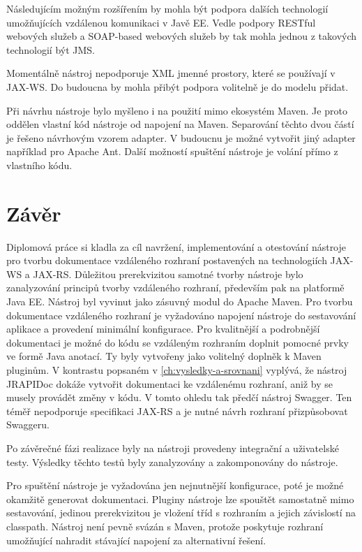 \documentclass[11pt,twoside,a4paper]{book}
\begin{document}
Následujícím možným rozšířením by mohla být podpora dalších technologií
umožňujících vzdálenou komunikaci v Javě EE. Vedle podpory RESTful webových
služeb a SOAP-based webových služeb by tak mohla jednou z takových technologií
být JMS.

Momentálně nástroj nepodporuje XML jmenné prostory, které se používají v JAX-WS.
Do budoucna by mohla přibýt podpora volitelně je do modelu přidat.

Při návrhu nástroje bylo myšleno i na použití mimo ekosystém Maven. Je proto
oddělen vlastní kód nástroje od napojení na Maven. Separování těchto dvou částí
je řešeno návrhovým vzorem adapter. V budoucnu je možné vytvořit jiný adapter
například pro Apache Ant. Další možností spuštění nástroje je volání přímo z
vlastního kódu.

\chapter{Závěr}

Diplomová práce si kladla za cíl navržení, implementování a otestování nástroje
pro tvorbu dokumentace vzdáleného rozhraní postavených na technologiích JAX-WS a
JAX-RS. Důležitou prerekvizitou samotné tvorby nástroje bylo zanalyzování
principů tvorby vzdáleného rozhraní, především pak na platformě Java EE. Nástroj
byl vyvinut jako zásuvný modul do Apache Maven. Pro tvorbu dokumentace
vzdáleného rozhraní je vyžadováno napojení nástroje do sestavování aplikace a
provedení minimální konfigurace. Pro kvalitnější a podrobnější dokumentaci je
možné do kódu se vzdáleným rozhraním doplnit pomocné
 prvky ve formě Java anotací. Ty byly vytvořeny jako volitelný doplněk k Maven
 pluginům. V kontrastu popsaném v \ref{ch:vysledky-a-srovnani} vyplývá, že
 nástroj JRAPIDoc dokáže vytvořit dokumentaci ke vzdálenému rozhraní, aniž by se
 musely provádět změny v kódu. V tomto ohledu tak předčí nástroj Swagger. Ten
 téměř nepodporuje specifikaci JAX-RS a je nutné návrh rozhraní přizpůsobovat
 Swaggeru.
 
Po závěrečné fázi realizace byly na nástroji provedeny integrační a uživatelské
testy.
Výsledky těchto testů byly zanalyzovány a zakomponovány do nástroje.

Pro spuštění nástroje je vyžadována jen nejnutnější konfigurace, poté je možné
okamžitě generovat dokumentaci. Pluginy nástroje lze spouštět samostatně mimo
sestavování, jedinou prerekvizitou je vložení tříd s rozhraním a jejich
závislostí na classpath. Nástroj není pevně svázán s Maven, protože poskytuje
rozhraní umožňující nahradit stávající napojení za alternativní řešení.
\end{document}
